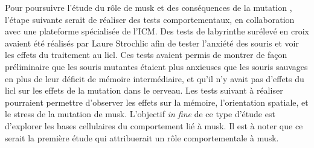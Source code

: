 Pour poursuivre l'étude du rôle de \gls{musk} et des conséquences de la mutation \mcrd, l'étape suivante serait de réaliser des tests comportementaux, en collaboration avec une plateforme spécialisée de l'ICM. Des tests de labyrinthe surélevé en croix avaient été réalisés par Laure Strochlic  afin de tester l'anxiété des souris \mcrd et voir les effets du traitement au \gls{licl}. Ces tests avaient permis de montrer de façon préliminaire que les souris mutantes étaient plus anxieuses que les souris sauvages en plus de leur déficit de mémoire intermédiaire, et qu'il n'y avait pas d'effets du \gls{licl} sur les effets de la mutation dans le cerveau. Les tests suivant à réaliser pourraient permettre d'observer les effets sur la mémoire, l'orientation spatiale, et le stress de la mutation de \gls{musk}. L'objectif \emph{in fine} de ce type d'étude est d'explorer les bases cellulaires du comportement lié à \gls{musk}. Il est à noter que ce serait la première étude qui attribuerait un rôle comportementale à \gls{musk}.